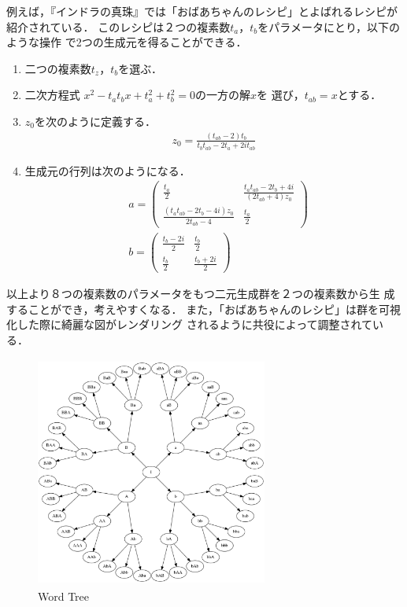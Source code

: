 例えば，『インドラの真珠』では「おばあちゃんのレシピ」とよばれるレシピが
紹介されている．
このレシピは２つの複素数$t_a$，$t_b$をパラメータにとり，以下のような操作
で2つの生成元を得ることができる．
\begin{enumerate}
 \item 二つの複素数$t_z$，$t_b$を選ぶ．
 \item  二次方程式
        $x^2 - t_a t_b x + t_a^2 + t_b^2 = 0 \text{の一方の解}x\text{を
        選び，}t_{ab}= x \text{とする． }$
 \item $z_0$を次のように定義する．
       \begin{align*}
        z_0 = \frac{(t_{ab} -2)t_b}{t_b t_{ab} - 2 t_a + 2it_{ab}}
       \end{align*}
 \item 生成元の行列は次のようになる．
        \begin{align*}
       &a = \left(
      \begin{array}{ccc}
       \frac{t_a}{2} & \frac{t_a t_{ab} - 2 t_b + 4i}{(2 t_{ab} + 4)z_0} \\
       \frac{(t_a t_{ab} - 2 t_b -4i)z_0}{2 t_{ab} - 4} & \frac{t_a}{2}
      \end{array}
     \right)\\
 &b = \left(
      \begin{array}{ccc}
       \frac{t_b - 2i}{2} & \frac{t_b}{2} \\
       \frac{t_b}{2} & \frac{t_b + 2i}{2}
      \end{array}
     \right)
        \end{align*}
\end{enumerate}
以上より８つの複素数のパラメータをもつ二元生成群を２つの複素数から生
成することができ，考えやすくなる．
また，「おばあちゃんのレシピ」は群を可視化した際に綺麗な図がレンダリング
されるように共役によって調整されている．

\begin{figure}[htbp]
 \center
 \includegraphics[width=3in, height=3in, keepaspectratio]{../img/klein/wordTree.pdf}
 \caption{Word Tree}
 \label{fig:wordTree}
\end{figure}

